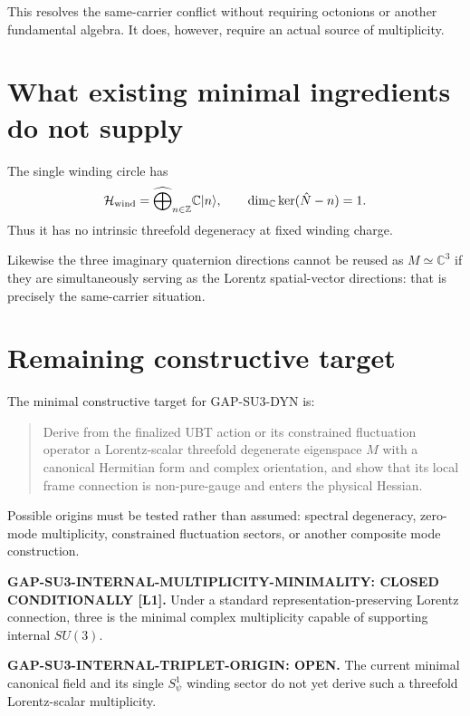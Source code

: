 \documentclass[11pt,a4paper]{article}
\begin{document}
This resolves the same-carrier conflict without requiring octonions or another
fundamental algebra. It does, however, require an actual source of
multiplicity.

\section{What existing minimal ingredients do not supply}

The single winding circle has
\[
 \mathcal H_{\rm wind}
 =\widehat\bigoplus_{n\in\mathbb Z}\mathbb C|n\rangle,
 \qquad
 \dim_{\mathbb C}\ker(\hat N-n)=1.
\]
Thus it has no intrinsic threefold degeneracy at fixed winding charge.

Likewise the three imaginary quaternion directions cannot be reused as
$M\simeq\mathbb C^3$ if they are simultaneously serving as the Lorentz
spatial-vector directions: that is precisely the same-carrier situation.

\section{Remaining constructive target}

The minimal constructive target for GAP-SU3-DYN is:

\begin{quote}
Derive from the finalized UBT action or its constrained fluctuation operator a
Lorentz-scalar threefold degenerate eigenspace $M$ with a canonical Hermitian
form and complex orientation, and show that its local frame connection is
non-pure-gauge and enters the physical Hessian.
\end{quote}

Possible origins must be tested rather than assumed: spectral degeneracy,
zero-mode multiplicity, constrained fluctuation sectors, or another composite
mode construction.

\begin{tcolorbox}[colback=yellow!8!white,colframe=orange!70!black,title=Status]
\textbf{GAP-SU3-INTERNAL-MULTIPLICITY-MINIMALITY: CLOSED CONDITIONALLY [L1].}
Under a standard representation-preserving Lorentz connection, three is the
minimal complex multiplicity capable of supporting internal $SU(3)$.

\medskip
\textbf{GAP-SU3-INTERNAL-TRIPLET-ORIGIN: OPEN.}
The current minimal canonical field and its single $S^1_\psi$ winding sector
do not yet derive such a threefold Lorentz-scalar multiplicity.
\end{tcolorbox}
\end{document}
